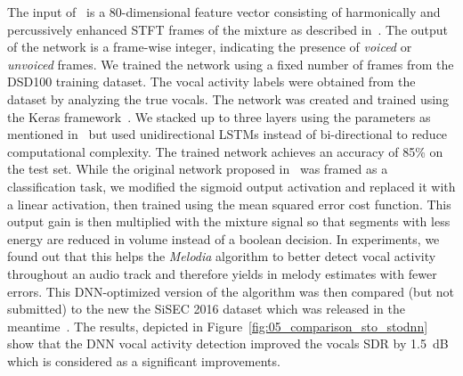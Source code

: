 The input of~\cite{Leglaive15} is a 80-dimensional feature vector consisting of harmonically and percussively enhanced STFT frames of the mixture as described in~\cite{ono08}.
The output of the network is a frame-wise integer, indicating the presence of \emph{voiced} or \emph{unvoiced} frames.
We trained the network using a fixed number of frames from the DSD100 training dataset.
The vocal activity labels were obtained from the dataset by analyzing the true vocals.
The network was created and trained using the Keras framework~\cite{chollet15}.
We stacked up to three layers using the parameters as mentioned in~\cite{Leglaive15} but used unidirectional LSTMs instead of bi-directional to reduce computational complexity.
The trained network achieves an accuracy of 85\% on the test set.
While the original network proposed in~\cite{Leglaive15} was framed as a classification task, we modified the sigmoid output activation and replaced it with a linear activation, then trained using the mean squared error cost function.
This output gain is then multiplied with the mixture signal so that segments with less energy are reduced in volume instead of a boolean decision.
In experiments, we found out that this helps the \emph{Melodia} algorithm to better detect vocal activity throughout an audio track and therefore yields in melody estimates with fewer errors.
This DNN-optimized version of the algorithm was then compared (but not submitted) to the new the SiSEC 2016 dataset which was released in the meantime~\cite{liutkus17}.
The results, depicted in Figure~\ref{fig:05_comparison_sto_stodnn} show that the DNN vocal activity detection improved the vocals SDR by 1.5~dB which is considered as a significant improvements.

